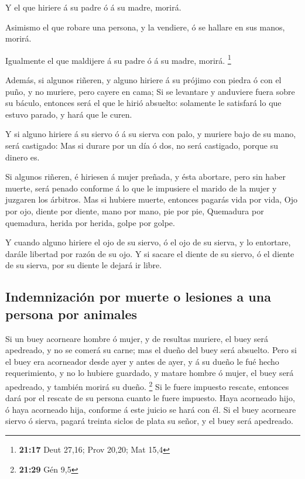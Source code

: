  Y el que hiriere á su padre ó á su madre, morirá.

 Asimismo el que robare una persona, y la vendiere, ó se
hallare en sus manos, morirá.

 Igualmente el que maldijere á su padre ó á su madre,
morirá. \footnote{\textbf{21:17} Deut 27,16; Prov 20,20; Mat 15,4}

 Además, si algunos riñeren, y alguno hiriere á su prójimo
con piedra ó con el puño, y no muriere, pero cayere en cama;
 Si se levantare y anduviere fuera sobre su báculo,
entonces será el que le hirió absuelto: solamente le satisfará lo que
estuvo parado, y hará que le curen.

 Y si alguno hiriere á su siervo ó á su sierva con palo, y
muriere bajo de su mano, será castigado:  Mas si durare por
un día ó dos, no será castigado, porque su dinero es.

 Si algunos riñeren, é hiriesen á mujer preñada, y ésta
abortare, pero sin haber muerte, será penado conforme á lo que le
impusiere el marido de la mujer y juzgaren los árbitros. 
Mas si hubiere muerte, entonces pagarás vida por vida,  Ojo
por ojo, diente por diente, mano por mano, pie por pie, 
Quemadura por quemadura, herida por herida, golpe por golpe.

 Y cuando alguno hiriere el ojo de su siervo, ó el ojo de
su sierva, y lo entortare, darále libertad por razón de su ojo.
 Y si sacare el diente de su siervo, ó el diente de su
sierva, por su diente le dejará ir libre.

\hypertarget{indemnizaciuxf3n-por-muerte-o-lesiones-a-una-persona-por-animales}{%
\subsection{Indemnización por muerte o lesiones a una persona por
animales}\label{indemnizaciuxf3n-por-muerte-o-lesiones-a-una-persona-por-animales}}

 Si un buey acorneare hombre ó mujer, y de resultas
muriere, el buey será apedreado, y no se comerá su carne; mas el dueño
del buey será absuelto.  Pero si el buey era acorneador
desde ayer y antes de ayer, y á su dueño le fué hecho requerimiento, y
no lo hubiere guardado, y matare hombre ó mujer, el buey será apedreado,
y también morirá su dueño. \footnote{\textbf{21:29} Gén 9,5}
 Si le fuere impuesto rescate, entonces dará por el rescate
de su persona cuanto le fuere impuesto.  Haya acorneado
hijo, ó haya acorneado hija, conforme á este juicio se hará con él.
 Si el buey acorneare siervo ó sierva, pagará treinta
siclos de plata su señor, y el buey será apedreado.

